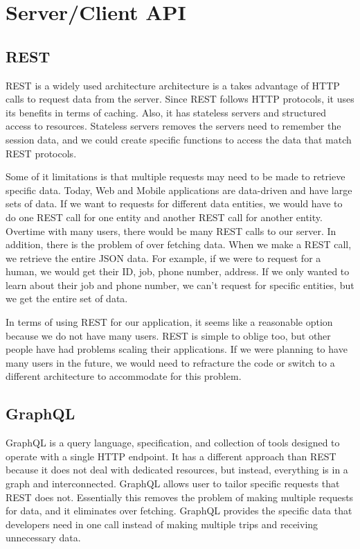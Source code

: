 \documentclass[draftclsnofoot, onecolumn, compsoc, 10pt]{IEEEtran}
\begin{document}
			
\section{Server/Client API}
    \subsection{REST}
    REST is a widely used architecture architecture is a takes advantage of HTTP calls to request data from the server. Since REST follows HTTP protocols, it uses its benefits in terms of caching. Also, it has stateless servers and structured access to resources. Stateless servers removes the servers need to remember the session data, and we could create specific functions to access the data that match REST protocols. 

    Some of it limitations is that multiple requests may need to be made to retrieve specific data. Today, Web and Mobile applications are data-driven and have large sets of data. If we want to requests for different data entities, we would have to do one REST call for one entity and another REST call for another entity. Overtime with many users, there would be many REST calls to our server. In addition, there is the problem of over fetching data. When we make a REST call, we retrieve the entire JSON data. For example, if we were to request for a human, we would get their ID, job, phone number, address. If we only wanted to learn about their job and phone number, we can’t request for specific entities, but we get the entire set of data. 

    In terms of using REST for our application, it seems like a reasonable option because we do not have many users. REST is simple to oblige too, but other people have had problems scaling their applications. If we were planning to have many users in the future, we would need to refracture the code or switch to a different architecture to accommodate for this problem. 
     \cite{RestvsGraph}

    
    \subsection{GraphQL}
    
    GraphQL is a query language, specification, and collection of tools designed to operate with a  single HTTP endpoint. It has a different approach than REST because it does not deal with dedicated resources, but instead, everything is in a graph and interconnected. GraphQL allows user to tailor specific requests that REST does not. Essentially this removes the problem of making multiple requests for data, and it eliminates over fetching. GraphQL provides the specific data that developers need in one call instead of making multiple trips and receiving unnecessary data. 
\end{document}
